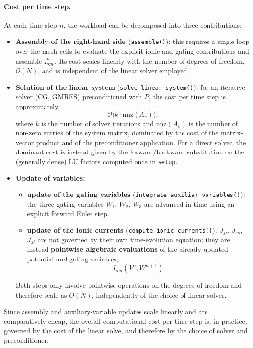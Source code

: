 \documentclass{Configuration_Files/PoliMi3i_thesis}
\begin{document}
\paragraph{Cost per time step.}
At each time step $n$, the workload can be decomposed into three contributions:
\begin{itemize}
  \item \textbf{Assembly of the right-hand side} (\texttt{assemble()}): this requires a
  single loop over the mesh cells to evaluate the explicit ionic and gating contributions
  and assemble $I^{n}_{app}$. Its cost scales linearly with the number of degrees
  of freedom, $\mathcal{O}(N)$, and is independent of the linear solver employed.
  \item \textbf{Solution of the linear system} (\texttt{solve\_linear\_system()}): for an
  iterative solver (CG, GMRES) preconditioned with $P$, the cost per time step is
  approximately
  \[
    \mathcal{O}\big(k \cdot \mathrm{nnz}(A_v)\big),
  \]
  where $k$ is the number of solver iterations and $\mathrm{nnz}(A_v)$ is the number of
  non-zero entries of the system matrix, dominated by the cost of the matrix-vector
  product and of the preconditioner application. For a direct solver, the dominant cost
  is instead given by the forward/backward substitution on the (generally dense) LU
  factors computed once in \texttt{setup}.
  \item \textbf{Update of variables:}
\begin{itemize}
  \item \textbf{update of the gating variables}
        (\texttt{integrate\_auxiliar\_variables()}): the three gating
        variables $W_1$, $W_2$, $W_3$ are advanced in time using an
        explicit forward Euler step.
  \item \textbf{update of the ionic currents}
        (\texttt{compute\_ionic\_currents()}): $J_{fi}$, $J_{so}$,
        $J_{si}$ are not governed by their own time-evolution equation;
        they are instead \textbf{pointwise algebraic evaluations} of the
        already-updated potential and gating variables,
        \[
        I_{ion}(V^n, W^{n+1}).
        \]
\end{itemize}
Both steps only involve pointwise operations on the degrees of freedom
and therefore scale as $O(N)$, independently of the choice of linear
solver.

\end{itemize}



Since assembly and auxiliary-variable updates scale linearly and are comparatively cheap,
the overall computational cost per time step is, in practice, governed by the cost of the
linear solve, and therefore by the choice of solver and preconditioner.
\end{document}
